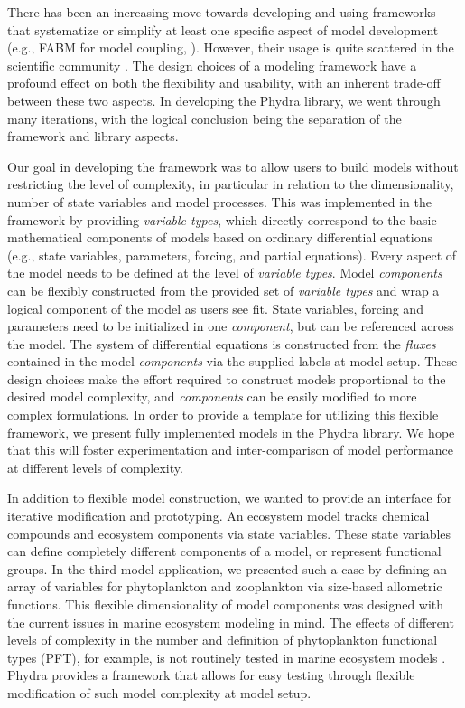 \documentclass[gmd, manuscript]{copernicus}
\begin{document}
There has been an increasing move towards developing and using frameworks that systematize or simplify at least one specific aspect of model development (e.g., FABM for model coupling, \citet{Bruggeman2014a}). However, their usage is quite scattered in the scientific community \citep{Janssen2015ExploringPerspective}. The design choices of a modeling framework have a profound effect on both the flexibility and usability, with an inherent trade-off between these two aspects. In developing the Phydra library, we went through many iterations, with the logical conclusion being the separation of the framework and library aspects.

Our goal in developing the framework was to allow users to build models without restricting the level of complexity, in particular in relation to the dimensionality, number of state variables and model processes. This was implemented in the framework by providing \textit{variable types}, which directly correspond to the basic mathematical components of models based on ordinary differential equations (e.g., state variables, parameters, forcing, and partial equations). Every aspect of the model needs to be defined at the level of \textit{variable types}. Model \textit{components} can be flexibly constructed from the provided set of \textit{variable types} and wrap a logical component of the model as users see fit. State variables, forcing and parameters need to be initialized in one \textit{component}, but can be referenced across the model. The system of differential equations is constructed from the \textit{fluxes} contained in the model \textit{components} via the supplied labels at model setup. These design choices make the effort required to construct models proportional to the desired model complexity, and \textit{components} can be easily modified to more complex formulations. In order to provide a template for utilizing this flexible framework, we present fully implemented models in the Phydra library. We hope that this will foster experimentation and inter-comparison of model performance at different levels of complexity.

In addition to flexible model construction, we wanted to provide an interface for iterative modification and prototyping. An ecosystem model tracks chemical compounds and ecosystem components via state variables. These state variables can define completely different components of a model, or represent functional groups. In the third model application, we presented such a case by defining an array of variables for phytoplankton and zooplankton via size-based allometric functions. This flexible dimensionality of model components was designed with the current issues in marine ecosystem modeling in mind. The effects of different levels of complexity in the number and definition of phytoplankton functional types (PFT), for example, is not routinely tested in marine ecosystem models \citep{Franks2009}. Phydra provides a framework that allows for easy testing through flexible modification of such model complexity at model setup. 
\end{document}
